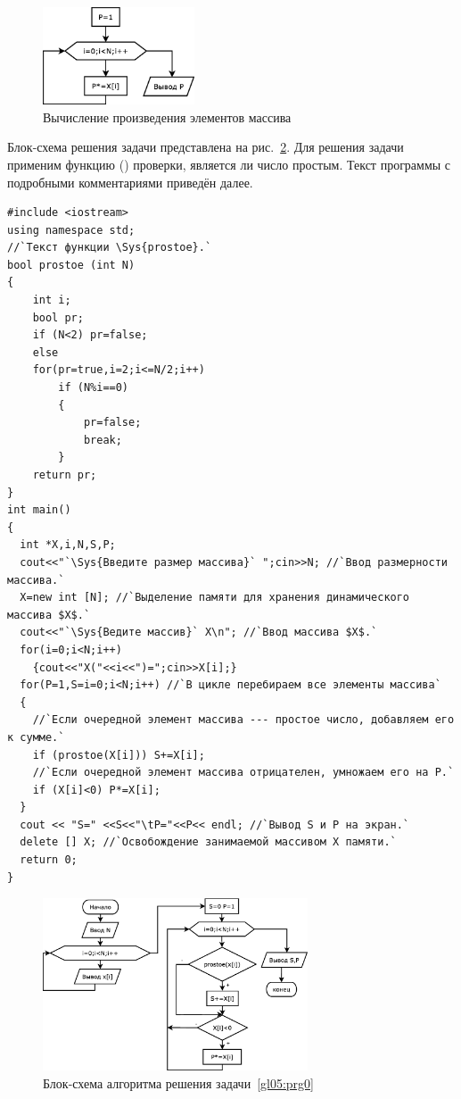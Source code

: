 \begin{figure}[htb]
\begin{center}
\includegraphics[width=0.4\textwidth]{img/ris_5_5}
\caption{Вычисление произведения элементов массива}
\label{ch05:refDrawing4}
\end{center}
\end{figure}

Блок-схема решения задачи представлена на рис.~\ref{ch05:refDrawing5}. 
Для решения задачи применим функцию ()
проверки, является ли число простым. Текст программы с подробными комментариями приведён далее.
\begin{lstlisting}
#include <iostream>
using namespace std;
//`Текст функции \Sys{prostoe}.`
bool prostoe (int N)
{
    int i;
    bool pr;
    if (N<2) pr=false;
    else
    for(pr=true,i=2;i<=N/2;i++)
        if (N%i==0)
        {
            pr=false;
            break;
        }
    return pr;
}
int main()
{
  int *X,i,N,S,P;
  cout<<"`\Sys{Введите размер массива}` ";cin>>N; //`Ввод размерности массива.`
  X=new int [N]; //`Выделение памяти для хранения динамического массива $X$.`
  cout<<"`\Sys{Ведите массив}` X\n"; //`Ввод массива $X$.`
  for(i=0;i<N;i++)
    {cout<<"X("<<i<<")=";cin>>X[i];}
  for(P=1,S=i=0;i<N;i++) //`В цикле перебираем все элементы массива`
  {
    //`Если очередной элемент массива --- простое число, добавляем его к сумме.`
    if (prostoe(X[i])) S+=X[i];
    //`Если очередной элемент массива отрицателен, умножаем его на P.`
    if (X[i]<0) P*=X[i];
  }
  cout << "S=" <<S<<"\tP="<<P<< endl; //`Вывод S и P на экран.`
  delete [] X; //`Освобождение занимаемой массивом X памяти.`
  return 0;
}
\end{lstlisting}

\begin{figure}[h]
\begin{center}
\includegraphics[width=0.7\textwidth]{img/ris_5_6}
\caption{Блок-схема алгоритма решения задачи~\ref{gl05:prg0}}
\label{ch05:refDrawing5}
\end{center}
\end{figure}

